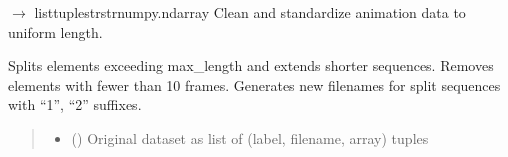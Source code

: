 \documentclass[letterpaper,10pt,english]{sphinxmanual}
\begin{document}

\begin{fulllineitems}
\label{\detokenize{autoapi/src/DataLoader/index:src.DataLoader.__interval}}
\pysigstartsignatures
\pysigline
{}
\pysigstopsignatures
\end{fulllineitems}


\begin{fulllineitems}
\label{\detokenize{autoapi/src/DataLoader/index:src.DataLoader.__dataset_cleaner_aux}}
\pysigstartsignatures
\pysiglinewithargsret
{}
{\sphinxparamcomma {}}
{{ $\rightarrow$ list\DUrole{p}{{[}}tuple\DUrole{p}{{[}}strstrnumpy.ndarray\DUrole{p}{{]}}\DUrole{p}{{]}}}}
\pysigstopsignatures
\sphinxAtStartPar
Clean and standardize animation data to uniform length.

\sphinxAtStartPar
Splits elements exceeding max\_length and extends shorter sequences.
Removes elements with fewer than 10 frames. Generates new filenames
for split sequences with “\sphinxhyphen{}1”, “\sphinxhyphen{}2” suffixes.
\begin{quote}\begin{description}
\begin{itemize}
\item {} 
\sphinxAtStartPar
{} (\sphinxstyleliteralemphasis{\sphinxupquote{{[}}}\sphinxstyleliteralemphasis{\sphinxupquote{{[}}}\sphinxstyleliteralemphasis{\sphinxupquote{, }}\sphinxstyleliteralemphasis{\sphinxupquote{, }}\sphinxstyleliteralemphasis{\sphinxupquote{{]}}}\sphinxstyleliteralemphasis{\sphinxupquote{{]}}}) \textendash{} Original dataset as list of (label, filename, array) tuples


\end{itemize}
\end{description}
\end{quote}
\end{fulllineitems}
\end{document}
